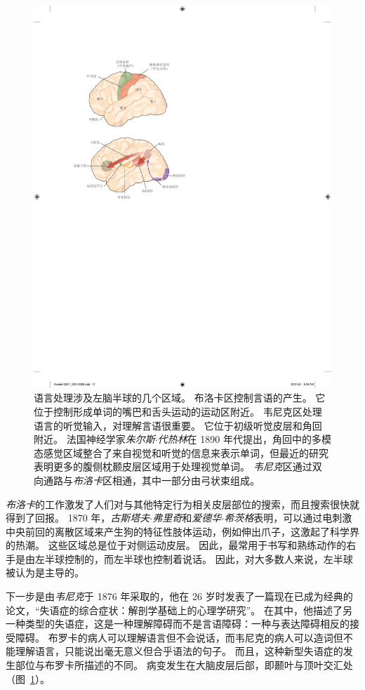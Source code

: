\begin{figure}[htbp]
	\centering
	\includegraphics[width=0.7\linewidth]{chap01/fig_1_6}
	\caption{语言处理涉及左脑半球的几个区域。
		布洛卡区控制言语的产生。
		它位于控制形成单词的嘴巴和舌头运动的运动区附近。
		韦尼克区处理语言的听觉输入，对理解言语很重要。
		它位于初级听觉皮层和角回附近。
		法国神经学家\textit{朱尔斯$\cdot$代热林}在 1890 年代提出，角回中的多模态感觉区域整合了来自视觉和听觉的信息来表示单词，但最近的研究表明更多的腹侧枕颞皮层区域用于处理视觉单词。
		\textit{韦尼克}区通过双向通路与\textit{布洛卡}区相通，其中一部分由弓状束组成\cite{geschwind1979specializations}。}
	\label{fig:1_6}
\end{figure}


\textit{布洛卡}的工作激发了人们对与其他特定行为相关皮层部位的搜索，而且搜索很快就得到了回报。
1870 年，\textit{古斯塔夫$\cdot$弗里奇}和\textit{爱德华$\cdot$希茨格}表明，可以通过电刺激中央前回的离散区域来产生狗的特征性肢体运动，例如伸出爪子，这激起了科学界的热潮。
这些区域总是位于对侧运动皮层。
因此，最常用于书写和熟练动作的右手是由左半球控制的，而左半球也控制着说话。
因此，对大多数人来说，左半球被认为是主导的。


下一步是由\textit{韦尼克}于 1876 年采取的，他在 26 岁时发表了一篇现在已成为经典的论文，“失语症的综合症状：解剖学基础上的心理学研究”。
在其中，他描述了另一种类型的失语症，这是一种理解障碍而不是言语障碍：一种与表达障碍相反的接受障碍。
布罗卡的病人可以理解语言但不会说话，而韦尼克的病人可以造词但不能理解语言，只能说出毫无意义但合乎语法的句子。
而且，这种新型失语症的发生部位与布罗卡所描述的不同。
病变发生在大脑皮层后部，即颞叶与顶叶交汇处（图~\ref{fig:1_6}）。


